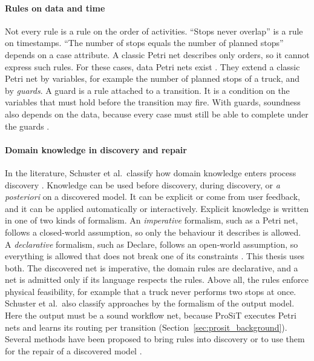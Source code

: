 \paragraph{Rules on data and time}
Not every rule is a rule on the order of activities. ``Stops never overlap'' is a
rule on timestamps. ``The number of stops equals the number of planned stops''
depends on a case attribute. A classic Petri net describes only orders, so it
cannot express such rules. For these cases, data Petri nets exist
\cite{Mannhardt2016Precision}. They extend a classic Petri net by variables, for
example the number of planned stops of a truck, and by \emph{guards}. A guard is
a rule attached to a transition. It is a condition on the variables that must
hold before the transition may fire. With guards, soundness also depends on the
data, because every case must still be able to complete under the guards
\cite{FelliDeLeoniMontali2021}.

\paragraph{Domain knowledge in discovery and repair}
In the literature, Schuster et al.\ classify how domain knowledge enters process
discovery \cite{schuster2022}. Knowledge can be used before discovery, during
discovery, or \emph{a posteriori} on a discovered model. It can be explicit
or come from user feedback, and it can be applied automatically or
interactively. Explicit knowledge is written in one of two kinds of formalism.
An \emph{imperative} formalism, such as a Petri net, follows a closed-world
assumption, so only the behaviour it describes is allowed. A \emph{declarative}
formalism, such as Declare, follows an open-world assumption, so everything is
allowed that does not break one of its constraints \cite{schuster2022}. This
thesis uses both. The discovered net is imperative, the domain rules are
declarative, and a net is admitted only if its language respects the rules.
Above all, the rules enforce physical feasibility, for example that a truck
never performs two stops at once. Schuster et al.\ also classify approaches by
the formalism of the output model. Here the output must be a sound workflow net,
because ProSiT executes Petri nets and learns its routing per transition
(Section~\ref{sec:prosit_background}). Several methods have been proposed to
bring rules into discovery or to use them for the repair of a discovered model
\cite{RWGreco2015Precedence,RWNorouzifar2026Rules,RWDixit2015Domain,Revoredo2023DomainRepair}.

